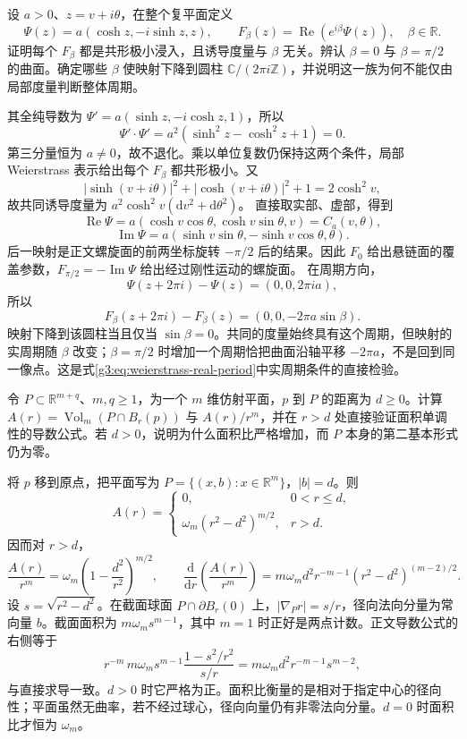 \begin{exercise}\label{g3:ex:catenoid-helicoid-period-family}
	设 \(a>0\)、\(z=v+i\theta\)，在整个复平面定义
	\[
		\Psi(z)=a(\cosh z,-i\sinh z,z),\qquad
		F_\beta(z)=\operatorname{Re}(e^{i\beta}\Psi(z)),\quad\beta\in\mathbb R.
	\]
	证明每个 \(F_\beta\) 都是共形极小浸入，且诱导度量与 \(\beta\) 无关。辨认 \(\beta=0\) 与 \(\beta=\pi/2\) 的曲面。确定哪些 \(\beta\) 使映射下降到圆柱 \(\mathbb C/(2\pi i\mathbb Z)\)，并说明这一族为何不能仅由局部度量判断整体周期。
\end{exercise}
\begin{solution}
	其全纯导数为 \(\Psi'=a(\sinh z,-i\cosh z,1)\)，所以
	\[
		\Psi'\cdot\Psi'=a^2(\sinh^2z-\cosh^2z+1)=0.
	\]
	第三分量恒为 \(a\ne0\)，故不退化。乘以单位复数仍保持这两个条件，局部 Weierstrass 表示给出每个 \(F_\beta\) 都共形极小。又
	\[
		|\sinh(v+i\theta)|^2+|\cosh(v+i\theta)|^2+1
		=2\cosh^2v,
	\]
	故共同诱导度量为 \(a^2\cosh^2v(\mathrm dv^2+\mathrm d\theta^2)\)。
	直接取实部、虚部，得到
	\[
		\operatorname{Re}\Psi=a(\cosh v\cos\theta,\cosh v\sin\theta,v)=C_a(v,\theta),
	\]
	\[
		\operatorname{Im}\Psi=a(\sinh v\sin\theta,-\sinh v\cos\theta,\theta).
	\]
	后一映射是正文螺旋面的前两坐标旋转 \(-\pi/2\) 后的结果。因此 \(F_0\) 给出悬链面的覆盖参数，\(F_{\pi/2}=-\operatorname{Im}\Psi\) 给出经过刚性运动的螺旋面。
	在周期方向，
	\[
		\Psi(z+2\pi i)-\Psi(z)=(0,0,2\pi ia),
	\]
	所以
	\[
		F_\beta(z+2\pi i)-F_\beta(z)=(0,0,-2\pi a\sin\beta).
	\]
	映射下降到该圆柱当且仅当 \(\sin\beta=0\)。共同的度量始终具有这个周期，但映射的实周期随 \(\beta\) 改变；\(\beta=\pi/2\) 时增加一个周期恰把曲面沿轴平移 \(-2\pi a\)，不是回到同一像点。这是式\eqref{g3:eq:weierstrass-real-period}中实周期条件的直接检验。
\end{solution}

\begin{exercise}\label{g3:ex:offset-plane-area-ratio}
	令 \(P\subset\mathbb R^{m+q}\)、\(m,q\ge1\)，为一个 \(m\) 维仿射平面，\(p\) 到 \(P\) 的距离为 \(d\ge0\)。计算 \(A(r)=\operatorname{Vol}_m(P\cap B_r(p))\) 与 \(A(r)/r^m\)，并在 \(r>d\) 处直接验证面积单调性的导数公式。若 \(d>0\)，说明为什么面积比严格增加，而 \(P\) 本身的第二基本形式仍为零。
\end{exercise}
\begin{solution}
	将 \(p\) 移到原点，把平面写为 \(P=\{(x,b):x\in\mathbb R^m\}\)，\(|b|=d\)。则
	\[
		A(r)=
		\begin{cases}
		0,&0<r\le d,\\
		\omega_m(r^2-d^2)^{m/2},&r>d.
		\end{cases}
	\]
	因而对 \(r>d\)，
	\[
		\frac{A(r)}{r^m}=\omega_m\left(1-\frac{d^2}{r^2}\right)^{m/2},\qquad
		\frac{\mathrm d}{\mathrm dr}\left(\frac{A(r)}{r^m}\right)
		=m\omega_m d^2r^{-m-1}(r^2-d^2)^{(m-2)/2}.
	\]
	设 \(s=\sqrt{r^2-d^2}\)。在截面球面 \(P\cap\partial B_r(0)\) 上，\(|\nabla_Pr|=s/r\)，径向法向分量为常向量 \(b\)。截面面积为 \(m\omega_m s^{m-1}\)，其中 \(m=1\) 时正好是两点计数。正文导数公式的右侧等于
	\[
		r^{-m}\,m\omega_m s^{m-1}\frac{1-s^2/r^2}{s/r}
		=m\omega_m d^2r^{-m-1}s^{m-2},
	\]
	与直接求导一致。\(d>0\) 时它严格为正。面积比衡量的是相对于指定中心的径向性；平面虽然无曲率，若不经过球心，径向向量仍有非零法向分量。\(d=0\) 时面积比才恒为 \(\omega_m\)。
\end{solution}

